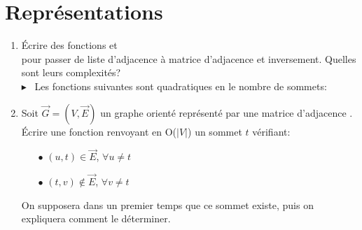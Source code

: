 \documentclass[mp2i]{exam}
\begin{document}
	\section{Représentations}
	\begin{enumerate}
		\item Écrire des fonctions  et \\
		 pour passer de liste d'adjacence à matrice d'adjacence et inversement. Quelles sont leurs complexités?
		\if{}
		\\$\blacktriangleright$~ Les fonctions suivantes sont quadratiques en le nombre de sommets:
		\begin{center}
			\hspace{.1cm}
		\end{center}
		\fi 
		\item Soit $\vec{G} = (V, \vec{E})$ un graphe orienté représenté par une matrice d'adjacence . \\
		Écrire une fonction  renvoyant en {O($\vert V \vert$)} un sommet $t$ vérifiant:
		\begin{itemize}
			\item[$\bullet$] $(u, t) \in \vec{E}$, $\forall u \neq t$
			\item[$\bullet$] $(t, v) \notin \vec{E}$, $\forall v \neq t$
		\end{itemize}  
		On supposera dans un premier temps que ce sommet existe, puis on expliquera comment le déterminer. 

\end{enumerate}
\end{document}
